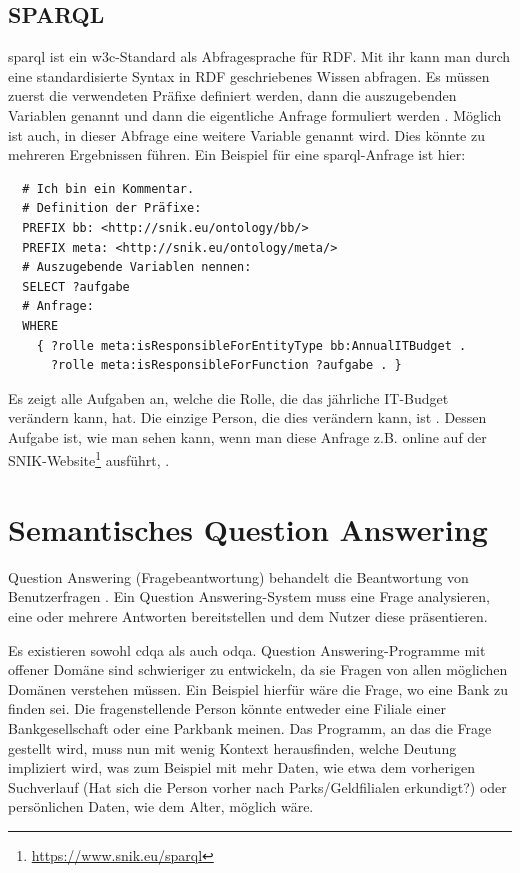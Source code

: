 \subsection{SPARQL}\label{sub:sparql}

\ac{sparql} ist ein \ac{w3c}-Standard als Abfragesprache für RDF.
Mit ihr kann man durch eine standardisierte Syntax in RDF geschriebenes Wissen abfragen.
Es müssen zuerst die verwendeten Präfixe definiert werden, dann die auszugebenden Variablen genannt und dann die eigentliche Anfrage formuliert werden \citep[S.~203]{semanticwebgrundlagen}.
Möglich ist auch, in dieser Abfrage eine weitere Variable genannt wird.
Dies könnte zu mehreren Ergebnissen führen.
Ein Beispiel für eine \ac{sparql}-Anfrage ist hier:
\begin{lstlisting}
  # Ich bin ein Kommentar.
  # Definition der Präfixe:
  PREFIX bb: <http://snik.eu/ontology/bb/>
  PREFIX meta: <http://snik.eu/ontology/meta/>
  # Auszugebende Variablen nennen:
  SELECT ?aufgabe
  # Anfrage:
  WHERE
    { ?rolle meta:isResponsibleForEntityType bb:AnnualITBudget .
      ?rolle meta:isResponsibleForFunction ?aufgabe . }
\end{lstlisting}
Es zeigt alle Aufgaben an, welche die Rolle, die das jährliche IT-Budget verändern kann, hat.
Die einzige Person, die dies verändern kann, ist .
Dessen Aufgabe ist, wie man sehen kann, wenn man diese Anfrage z.B. online auf der SNIK-Website\footnote{\url{https://www.snik.eu/sparql}} ausführt, .

\section{Semantisches Question Answering}

\begin{definition}
Question Answering (Fragebeantwortung) behandelt die Beantwortung von Benutzerfragen \citep{qadefinition}.
Ein Question Answering-System muss eine Frage analysieren, eine oder mehrere Antworten bereitstellen und dem Nutzer diese präsentieren.
\end{definition}

Es existieren sowohl \ac{cdqa} als auch \ac{odqa}.
Question Answering-Programme mit offener Domäne sind schwieriger zu entwickeln,
da sie Fragen von allen möglichen Domänen verstehen müssen.
Ein Beispiel hierfür wäre die Frage, wo eine Bank zu finden sei.
Die fragenstellende Person könnte entweder eine Filiale einer Bankgesellschaft oder eine Parkbank meinen.
Das Programm, an das die Frage gestellt wird, muss nun mit wenig Kontext herausfinden,
welche Deutung impliziert wird, was zum Beispiel mit mehr Daten,
wie etwa dem vorherigen Suchverlauf (Hat sich die Person vorher nach Parks/Geldfilialen erkundigt?)
oder persönlichen Daten, wie dem Alter, möglich wäre.

